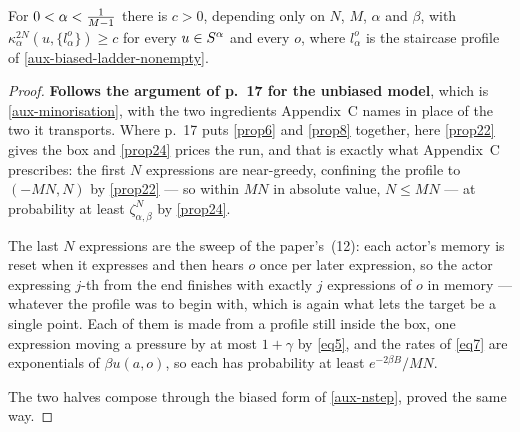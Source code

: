 \begin{lemma}
  \label{aux-biased-minorisation}
  \leanok
  For $0 < \alpha < \tfrac{1}{M-1}$ there is $c > 0$, depending only on $N$, $M$,
  $\alpha$ and $\beta$, with $\kappa_\alpha^{2N}(u, \{l_\alpha^o\}) \ge c$ for
  every $u \in S^\alpha$ and every $o$, where $l_\alpha^o$ is the staircase
  profile of \ref{aux-biased-ladder-nonempty}.
\end{lemma}
\begin{proof}
  \leanok
  \textbf{Follows the argument of p.~17 for the unbiased model}, which is
  \ref{aux-minorisation}, with the two ingredients Appendix~C names in place of
  the two it transports.  Where p.~17 puts \ref{prop6} and \ref{prop8}
  together, here \ref{prop22} gives the box and \ref{prop24} prices the run, and
  that is exactly what Appendix~C prescribes: the first $N$ expressions are
  near-greedy, confining the profile to $(-MN, N)$ by \ref{prop22} --- so within
  $MN$ in absolute value, $N \le MN$ --- at probability at least
  $\zeta_{\alpha,\beta}^N$ by \ref{prop24}.

  The last $N$ expressions are the sweep of the paper's~(12): each actor's memory
  is reset when it expresses and then hears $o$ once per later expression, so the
  actor expressing $j$-th from the end finishes with exactly $j$ expressions of
  $o$ in memory --- whatever the profile was to begin with, which is again what
  lets the target be a single point.  Each of them is made from a profile still
  inside the box, one expression moving a pressure by at most $1 + \gamma$ by
  \ref{eq5}, and the rates of \ref{eq7} are exponentials of $\beta u(a,o)$, so
  each has probability at least $e^{-2\beta B}/MN$.

  The two halves compose through the biased form of \ref{aux-nstep}, proved the
  same way.
\end{proof}

